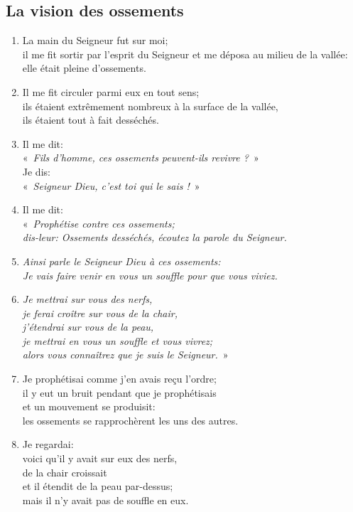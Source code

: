 \documentclass[12pt,a4paper,titlepage]{article}
\def \pslabelsep{0.2em} %
\def \psleftmargin{0em} %
\begin{document}
\subsection*{La vision des ossements}
\begin{enumerate}[leftmargin=\psleftmargin, labelsep = \pslabelsep, label={\arabic*}, font=\color{\pscolor}\small\textsuperscript, parsep=0em, itemsep=0em, topsep=0em ]
\item La main du Seigneur fut sur moi; \\ il me fit sortir par l’esprit du Seigneur et me déposa au milieu de la vallée: \\ elle était pleine d’ossements.
\item Il me fit circuler parmi eux en tout sens; \\ ils étaient extrêmement nombreux à la surface de la vallée, \\ ils étaient tout à fait desséchés.
\item Il me dit: \\ \decalage «~\textit{Fils d’homme, ces ossements peuvent-ils revivre ?}~» \\ Je dis: \\
\decalage «~\textit{Seigneur Dieu, c’est toi qui le sais !}~»
\item Il me dit: \\ \decalage «~\textit{Prophétise contre ces ossements; \\ \decalage dis-leur: Ossements desséchés, écoutez la parole du Seigneur.}
\item \decalage \textit{Ainsi parle le Seigneur Dieu à ces ossements: \\ \decalage Je vais faire venir en vous un souffle pour que vous viviez.}
\item \decalage \textit{Je mettrai sur vous des nerfs, \\ \decalage je ferai croître sur vous de la chair, \\ \decalage j’étendrai sur vous de la peau, \\ \decalage je mettrai en vous un souffle et vous vivrez; \\ \decalage alors vous connaîtrez que je suis le Seigneur.}~»
\item Je prophétisai comme j’en avais reçu l’ordre; \\ il y eut un bruit pendant que je prophétisais \\ et un mouvement se produisit: \\ les ossements se rapprochèrent les uns des autres.
\item Je regardai: \\ voici qu’il y avait sur eux des nerfs, \\ de la chair croissait \\ et il étendit de la peau par-dessus; \\ mais il n’y avait pas de souffle en eux.\verseSpace

\end{enumerate}
\end{document}
